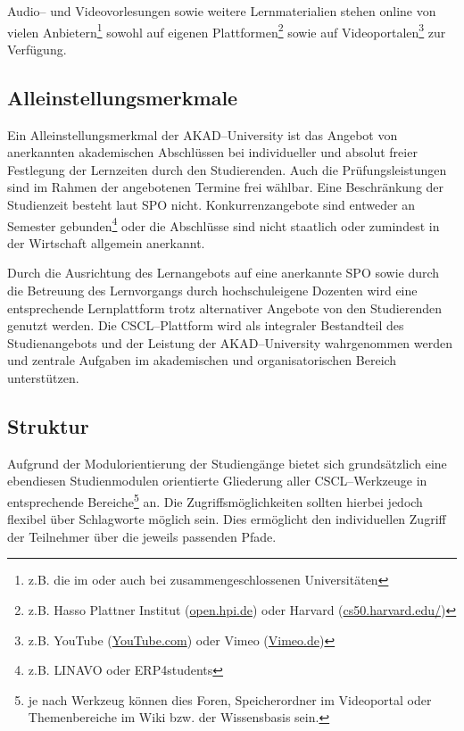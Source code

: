 Audio– und Videovorlesungen sowie weitere Lernmaterialien stehen online von vielen Anbietern\footnote{z.B. die im  oder auch bei  zusammengeschlossenen Universitäten} sowohl auf eigenen Plattformen\footnote{z.B. Hasso Plattner Institut (\url{open.hpi.de}) oder Harvard (\url{cs50.harvard.edu/})} sowie auf Videoportalen\footnote{z.B. YouTube (\url{YouTube.com}) oder Vimeo (\url{Vimeo.de})} zur Verfügung.

\subsection{Alleinstellungsmerkmale} %
\label{sub:alleinstellungsmerkmale_plazierung}
Ein Alleinstellungsmerkmal der AKAD–University ist das Angebot von anerkannten akademischen Abschlüssen bei individueller und absolut freier Festlegung der Lernzeiten durch den Studierenden. Auch die Prüfungsleistungen sind im Rahmen der angebotenen Termine frei wählbar. Eine Beschränkung der Studienzeit besteht laut \ac{SPO} nicht. Konkurrenzangebote sind entweder an Semester gebunden\footnote{z.B. \ac{LINAVO} oder ERP4students} oder die Abschlüsse sind nicht staatlich oder zumindest in der Wirtschaft allgemein anerkannt.

Durch die Ausrichtung des Lernangebots auf eine anerkannte \ac{SPO} sowie durch die Betreuung des Lernvorgangs durch hochschuleigene Dozenten wird eine entsprechende Lernplattform trotz alternativer Angebote von den Studierenden genutzt werden. Die \ac{CSCL}–Plattform wird als integraler Bestandteil des Studienangebots und der Leistung der AKAD–University wahrgenommen werden und zentrale Aufgaben im akademischen und organisatorischen Bereich unterstützen.

\subsection{Struktur} %
\label{sub:struktur}
Aufgrund der Modulorientierung der Studiengänge bietet sich grundsätzlich eine ebendiesen Studienmodulen orientierte Gliederung aller \ac{CSCL}–Werkzeuge in entsprechende Bereiche\footnote{je nach Werkzeug können dies Foren, Speicherordner im Videoportal oder Themenbereiche im Wiki bzw. der Wissensbasis sein.} an. Die Zugriffsmöglichkeiten sollten hierbei jedoch flexibel über Schlagworte möglich sein. Dies ermöglicht den individuellen Zugriff der Teilnehmer über die jeweils passenden Pfade. 

